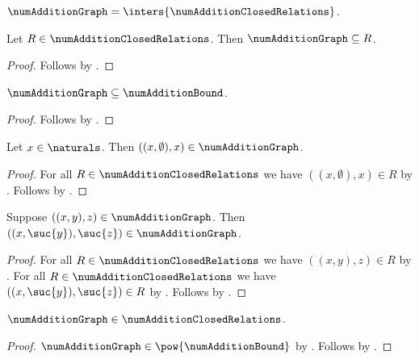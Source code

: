 \begin{definition}\label{num_addition_graph}
    $\numAdditionGraph =
        \inters{\numAdditionClosedRelations}$.
\end{definition}

\begin{proposition}\label{num_addition_graph_minimal}
    Let $R\in\numAdditionClosedRelations$.
    Then $\numAdditionGraph\subseteq R$.
\end{proposition}
\begin{proof}
    Follows by .
\end{proof}

\begin{proposition}\label{num_addition_graph_bound}
    $\numAdditionGraph\subseteq\numAdditionBound$.
\end{proposition}
\begin{proof}
    Follows by .
\end{proof}

\begin{proposition}\label{num_addition_graph_zero_intro}
    Let $x\in\naturals$.
    Then $((x,\emptyset),x)\in\numAdditionGraph$.
\end{proposition}
\begin{proof}
    For all $R\in\numAdditionClosedRelations$ we have
        $((x,\emptyset),x)\in R$
        by .
    Follows by .
\end{proof}

\begin{proposition}\label{num_addition_graph_successor_intro}
    Suppose $((x,y),z)\in\numAdditionGraph$.
    Then $((x,\suc{y}),\suc{z})\in\numAdditionGraph$.
\end{proposition}
\begin{proof}
    For all $R\in\numAdditionClosedRelations$ we have
        $((x,y),z)\in R$ by .
    For all $R\in\numAdditionClosedRelations$ we have
        $((x,\suc{y}),\suc{z})\in R$
        by .
    Follows by .
\end{proof}

\begin{proposition}\label{num_addition_graph_closed}
    $\numAdditionGraph\in\numAdditionClosedRelations$.
\end{proposition}
\begin{proof}
    $\numAdditionGraph\in\pow{\numAdditionBound}$
        by .
    Follows by .
\end{proof}

